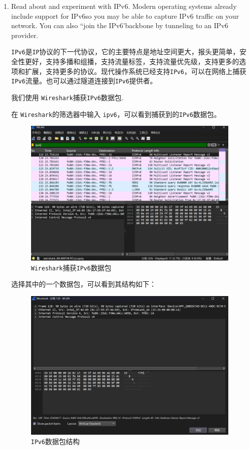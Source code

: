 \documentclass{article}
\begin{document}
	\begin{enumerate}[noitemsep]
		\item Read about and experiment with IPv6. Modern operating systems already include support for IPv6so you may be able to capture IPv6 traffic on your network. You can also “join the IPv6'backbone by tunneling to an IPv6 provider.
		
		\texttt{IPv6}是\texttt{IP}协议的下一代协议，它的主要特点是地址空间更大，报头更简单，安全性更好，支持多播和组播，支持流量标签，支持流量优先级，支持更多的选项和扩展，支持更多的协议。现代操作系统已经支持\texttt{IPv6}，可以在网络上捕获\texttt{IPv6}流量。也可以通过隧道连接到\texttt{IPv6}提供者。
		
		我们使用 \texttt{Wireshark}捕获\texttt{IPv6}数据包.
		
		在 \texttt{Wireshark}的筛选器中输入 \texttt{ipv6}，可以看到捕获到的\texttt{IPv6}数据包。
		
		\begin{figure}[H]
			\centering
			\includegraphics[width=11cm]{images/23. Wireshark捕获IPv6数据包.jpg}
			\caption{\texttt{Wireshark}捕获\texttt{IPv6}数据包}
			\label{fig:23}
		\end{figure}
		
		选择其中的一个数据包，可以看到其结构如下：
		
		\begin{figure}[H]
			\centering
			\includegraphics[width=11cm]{images/24. IPv6数据包结构.jpg}
			\caption{\texttt{IPv6}数据包结构}
			\label{fig:24}
		\end{figure}
		

\end{enumerate}
\end{document}
